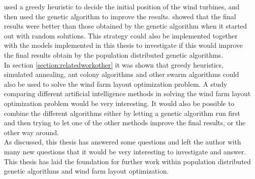 \noindent \cite{Saavedra-Morena} used a greedy heuristic to decide the initial position of the wind turbines, and then used the genetic algorithm to improve the results. \cite{Saavedra-Morena} showed that the final results were better than those obtained by the genetic algorithm when it started out with random solutions. This strategy could also be implemented together with the models implemented in this thesis to investigate if this would improve the final results obtain by the population distributed genetic algorithms. \\


\noindent In section \ref{section:relatedworkother} it was shown that greedy heuristics, simulated annealing, ant colony algorithms and other swarm algorithms could also be used to solve the wind farm layout optimization problem. A study comparing different artificial intelligence methods in solving the wind farm layout optimization problem would be very interesting. It would also be possible to combine the different algorithms either by letting a genetic algorithm run first and then trying to let one of the other methods improve the final results, or the other way around.\\

\noindent As discussed, this thesis has answered some questions and left the author with many new questions that it would be very interesting to investigate and answer. This thesis has laid the foundation for further work within population distributed genetic algorithms and wind farm layout optimization.\\